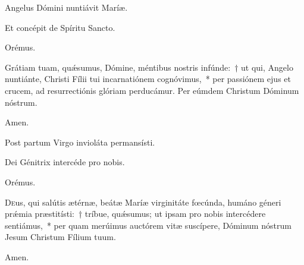 
\noindent \vv Angelus Dómini nuntiávit Maríæ.

\noindent \rr Et concépit de Spíritu San\-cto.

Orémus.

\noindent Grátiam tuam, quǽsumus, Dómine, méntibus nostris infúnde:~† ut qui, Angelo nuntiánte, Christi Fílii tui incarnatiónem cognóvimus,~* per passiónem ejus et crucem, ad resurrectiónis glóriam perducámur. Per eúmdem Christum Dóminum nóstrum.

\rr  Amen.


\noindent \vv Post partum Virgo invioláta permansísti.

\noindent \rr Dei Génitrix intercéde pro nobis.

Orémus.

\lettrine{D}{e}us, qui salútis ætérnæ, beátæ Maríæ virginitáte fœcúnda, humáno géneri prǽmia præstitísti:~† tríbue, quǽsumus; ut ipsam pro nobis intercédere sentiámus,~* per quam merúimus auctórem vitæ suscípere, Dóminum nóstrum Jesum Christum Fílium tuum.

\rr  Amen.